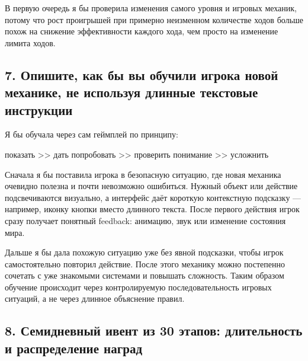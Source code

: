 \documentclass{ZGJournalArticle_2026}
\begin{document}
В первую очередь я бы проверила изменения самого уровня и игровых
механик, потому что рост проигрышей при примерно неизменном количестве
ходов больше похож на снижение эффективности каждого хода, чем просто на
изменение лимита ходов.

\newpage

\subsection{7. Опишите, как бы вы обучили игрока новой механике, не
используя длинные текстовые
инструкции}\label{ux43eux43fux438ux448ux438ux442ux435-ux43aux430ux43a-ux431ux44b-ux432ux44b-ux43eux431ux443ux447ux438ux43bux438-ux438ux433ux440ux43eux43aux430-ux43dux43eux432ux43eux439-ux43cux435ux445ux430ux43dux438ux43aux435-ux43dux435-ux438ux441ux43fux43eux43bux44cux437ux443ux44f-ux434ux43bux438ux43dux43dux44bux435-ux442ux435ux43aux441ux442ux43eux432ux44bux435-ux438ux43dux441ux442ux440ux443ux43aux446ux438ux438}

Я бы обучала через сам геймплей по принципу:

показать \textgreater\textgreater{} дать попробовать
\textgreater\textgreater{} проверить понимание
\textgreater\textgreater{} усложнить

Сначала я бы поставила игрока в безопасную ситуацию, где новая механика
очевидно полезна и почти невозможно ошибиться. Нужный объект или
действие подсвечиваются визуально, а интерфейс даёт короткую контекстную
подсказку --- например, иконку кнопки вместо длинного текста. После
первого действия игрок сразу получает понятный feedback: анимацию, звук
или изменение состояния мира.

Дальше я бы дала похожую ситуацию уже без явной подсказки, чтобы игрок
самостоятельно повторил действие. После этого механику можно постепенно
сочетать с уже знакомыми системами и повышать сложность. Таким образом
обучение происходит через контролируемую последовательность игровых
ситуаций, а не через длинное объяснение правил.

\newpage

\subsection{8. Семидневный ивент из 30 этапов: длительность и
распределение
наград}\label{ux441ux435ux43cux438ux434ux43dux435ux432ux43dux44bux439-ux438ux432ux435ux43dux442-ux438ux437-30-ux44dux442ux430ux43fux43eux432-ux434ux43bux438ux442ux435ux43bux44cux43dux43eux441ux442ux44c-ux438-ux440ux430ux441ux43fux440ux435ux434ux435ux43bux435ux43dux438ux435-ux43dux430ux433ux440ux430ux434}
\end{document}
